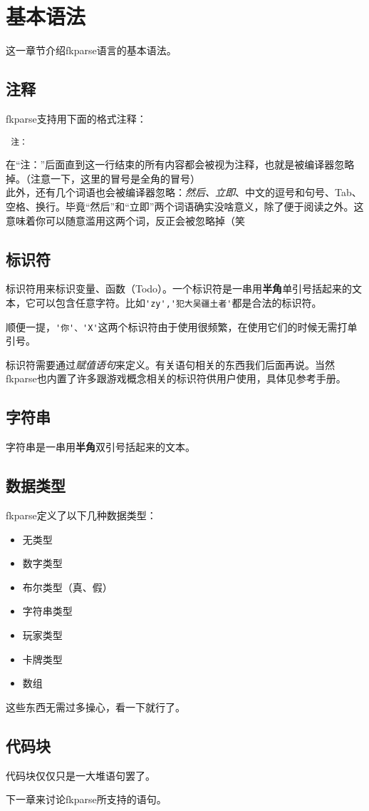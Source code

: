 \chapter{基本语法}

这一章节介绍fkparse语言的基本语法。

\section{注释}

fkparse支持用下面的格式注释：

\begin{verbatim}
 注：
\end{verbatim}

在“注：”后面直到这一行结束的所有内容都会被视为注释，也就是被编译器忽略掉。（注意一下，这里的冒号是全角的冒号）\\

此外，还有几个词语也会被编译器忽略：\emph{然后、立即}、中文的逗号和句号、Tab、空格、换行。毕竟“然后”和“立即”两个词语确实没啥意义，除了便于阅读之外。这意味着你可以随意滥用这两个词，反正会被忽略掉（笑

\section{标识符}

标识符用来标识变量、函数（Todo）。一个标识符是一串用\textbf{半角}单引号括起来的文本，它可以包含任意字符。比如\verb|'zy','犯大吴疆土者'|都是合法的标识符。

顺便一提，\verb|'你'、'X'|这两个标识符由于使用很频繁，在使用它们的时候无需打单引号。

标识符需要通过\textit{赋值语句}来定义。有关语句相关的东西我们后面再说。当然fkparse也内置了许多跟游戏概念相关的标识符供用户使用，具体见参考手册。

\section{字符串}

字符串是一串用\textbf{半角}双引号括起来的文本。

\section{数据类型}

fkparse定义了以下几种数据类型：

\begin{itemize}
 \item 无类型
 \item 数字类型
 \item 布尔类型（真、假）
 \item 字符串类型
 \item 玩家类型
 \item 卡牌类型
 \item 数组
\end{itemize}

这些东西无需过多操心，看一下就行了。

\section{代码块}

代码块仅仅只是一大堆语句罢了。

下一章来讨论fkparse所支持的语句。


